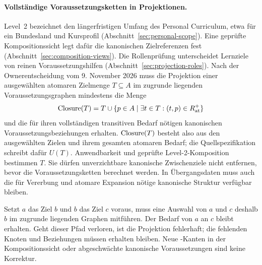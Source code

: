 \paragraph{Vollständige Voraussetzungsketten in Projektionen.}
\label{par:projection-closure}
Level~2 bezeichnet den längerfristigen Umfang des Personal Curriculum,
etwa für ein Bundesland und Kursprofil (Abschnitt~\ref{sec:personal-scope}).
Eine geprüfte Kompositionssicht legt dafür die kanonischen Zielreferenzen
fest (Abschnitt~\ref{sec:composition-views}). Die Rollenprüfung unterscheidet
Lernziele  von reinen Voraussetzungshilfen
 (Abschnitt~\ref{sec:projection-roles}).
Nach der Ownerentscheidung vom 9. November 2026 muss die Projektion
einer ausgewählten atomaren Zielmenge $T\subseteq A$ im zugrunde liegenden
Voraussetzungsgraphen mindestens die Menge
\[
 \operatorname{Closure}(T)=T\cup\{p\in A\mid\exists t\in T:(t,p)\in R_{\mathrm{at}}^+\}
\]
und die für ihren vollständigen transitiven Bedarf nötigen kanonischen
Voraussetzungsbeziehungen erhalten. $\operatorname{Closure}(T)$ besteht also aus den
ausgewählten Zielen und ihrem gesamten atomaren Bedarf; die
Quellspezifikation schreibt dafür $U(T)$. Anwendbarkeit und geprüfte
Level-2-Komposition bestimmen $T$. Sie dürfen unverzichtbare kanonische
Zwischenziele nicht entfernen, bevor die Voraussetzungsketten berechnet
werden. In Übergangsdaten muss auch die für Vererbung und atomare
Expansion nötige kanonische Struktur verfügbar bleiben.

Setzt $a$ das Ziel $b$ und $b$ das Ziel $c$ voraus, muss eine Auswahl von
$a$ und $c$ deshalb $b$ im zugrunde liegenden Graphen mitführen. Der
Bedarf von $a$ an $c$ bleibt erhalten. Geht dieser Pfad verloren, ist
die Projektion fehlerhaft; die fehlenden Knoten und Beziehungen müssen
erhalten bleiben. Neue -Kanten in der Kompositionssicht
oder abgeschwächte kanonische Voraussetzungen sind keine Korrektur.

